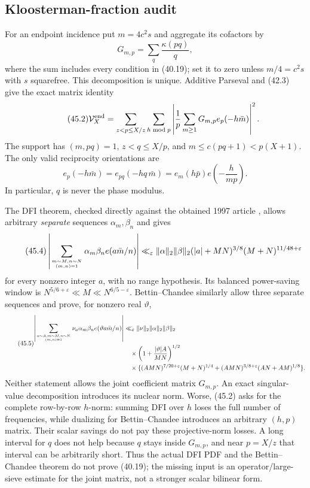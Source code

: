 \documentclass[10pt,reqno]{amsart}
\theoremstyle{definition}
\newcommand{\1}{\mathbf 1}
\newcommand{\eps}{\varepsilon}
\begin{document}
\subsection{Kloosterman-fraction audit}
For an endpoint incidence put $m=4c^2s$ and aggregate its cofactors by
\begin{equation}\tag{45.1}
 G_{m,p}=\sum_{q}\frac{\kappa(pq)}q,
\end{equation}
where the sum includes every condition in (40.19); set it to zero unless
$m/4=c^2s$ with $s$ squarefree.  This decomposition is unique.  Additive
Parseval and (42.3) give the exact matrix identity
\begin{equation}\tag{45.2}
 \mathcal V_X^{\rm end}
 =\sum_{z<p\leq X/z}\sum_{h\bmod p}
   \left|\frac1p\sum_{m\geq1}G_{m,p}e_p(-h\bar m)\right|^2.
\end{equation}
The support has $(m,pq)=1$, $z<q\leq X/p$, and
$m\leq c(pq+1)<p(X+1)$.  The only valid reciprocity orientations are
\begin{equation}\tag{45.3}
 e_p(-h\bar m)=e_{pq}(-hq\,\bar m)
 =e_m(h\bar p)e\left(-\frac h{mp}\right).
\end{equation}
In particular, $q$ is never the phase modulus.

The DFI theorem, checked directly against the obtained 1997 article
\cite{DFI}, allows arbitrary \emph{separate} sequences $\alpha_m,\beta_n$
and gives
\begin{equation}\tag{45.4}
 \left|\sum_{m\sim M,n\sim N\atop(m,n)=1}
 \alpha_m\beta_ne(a\bar m/n)\right|
 \ll_\eps\|\alpha\|_2\|\beta\|_2
 (|a|+MN)^{3/8}(M+N)^{11/48+\eps}
\end{equation}
for every nonzero integer $a$, with no range hypothesis.  Its balanced
power-saving window is $N^{5/6+\eps}\ll M\ll N^{6/5-\eps}$.
Bettin--Chandee \cite{BettinChandee} similarly allow three separate
sequences and prove, for nonzero real $\vartheta$,
\begingroup
\footnotesize
\begin{equation}\tag{45.5}
 \begin{split}
 \left|\sum_{a\sim A,m\sim M,n\sim N\atop(m,n)=1}
 \nu_a\alpha_m\beta_ne(\vartheta a\bar m/n)\right|
 &\ll_\eps\|\nu\|_2\|\alpha\|_2\|\beta\|_2\\
 &\quad\times\left(1+\frac{|\vartheta|A}{MN}\right)^{1/2}\\
 &\quad\times\{(AMN)^{7/20+\eps}(M+N)^{1/4}
 +(AMN)^{3/8+\eps}(AN+AM)^{1/8}\}.
 \end{split}
\end{equation}
\endgroup
Neither statement allows the joint coefficient matrix $G_{m,p}$.  An exact
singular-value decomposition introduces its nuclear norm.  Worse, (45.2)
asks for the complete row-by-row $h$-norm: summing DFI over $h$ loses the
full number of frequencies, while dualizing for Bettin--Chandee introduces
an arbitrary $(h,p)$ matrix.  Their scalar savings do not pay these
projective-norm losses.  A long interval for $q$ does not help because $q$
stays inside $G_{m,p}$, and near $p=X/z$ that interval can be arbitrarily
short.  Thus the actual DFI PDF and the Bettin--Chandee theorem do not prove
(40.19); the missing input is an operator/large-sieve estimate for the joint
matrix, not a stronger scalar bilinear form.
\end{document}
